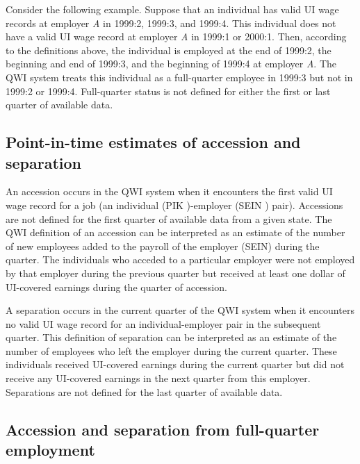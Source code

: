 Consider the following example. Suppose that an individual has valid {UI}
wage records at employer \textit{A} in 1999:2, 1999:3, and 1999:4. This
individual does not have a valid {UI} wage record at employer \textit{A} in
1999:1 or 2000:1. Then, according to the definitions above, the individual
is employed at the end of 1999:2, the beginning and end of 1999:3, and the
beginning of 1999:4 at employer \textit{A}. The QWI system treats this
individual as a full-quarter employee in 1999:3 but not in 1999:2 or 1999:4.
Full-quarter status is not defined for either the first or last quarter of
available data.

\subsection{Point-in-time estimates of accession and separation}

 

An accession occurs in the QWI system when it encounters the first valid UI%
 wage record for a job (an individual (PIK%
)-employer (SEIN%
) pair). Accessions are not defined for the first quarter of
available data from a given state. The QWI definition of an accession can be
interpreted as an estimate of the number of new employees added to the
payroll of the employer ({SEIN}) during the quarter. The individuals who
acceded to a particular employer were not employed by that employer during
the previous quarter but received at least one dollar of {UI}-covered
earnings during the quarter of accession.

A separation occurs in the current quarter of the QWI system when it
encounters no valid {UI} wage record for an individual-employer pair in the
subsequent quarter. This definition of separation can be interpreted as an
estimate of the number of employees who left the employer during the current
quarter. These individuals received {UI}-covered earnings during the current
quarter but did not receive any {UI}-covered earnings in the next quarter
from this employer. Separations are not defined for the last quarter of
available data.

\subsection{Accession and separation from full-quarter employment}

 

